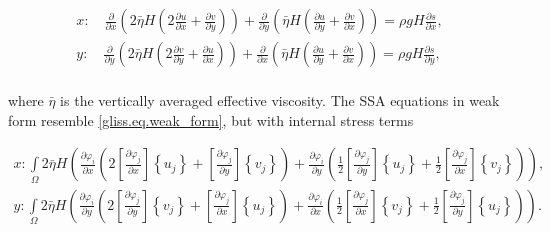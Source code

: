 {\begin{equation}
  \label{gliss.eq.stress_balance_ssa}
  \begin{split}
    x: \quad \frac{\partial }{\partial x}\left( 2 \bar{\eta} H \left(2\frac{\partial u}{\partial x} +  \frac{\partial v}{\partial y} \right) \right) 
    + \frac{\partial }{\partial y}\left( \bar{\eta} H \left( \frac{\partial u}{\partial y} + \frac{\partial v}{\partial x} \right) \right) 
    = \rho gH \frac{\partial s}{\partial x}, \\
    y: \quad \frac{\partial }{\partial y}\left( 2 \bar{\eta} H \left( 2\frac{\partial v}{\partial y} + \frac{\partial u}{\partial x} \right) \right) 
    + \frac{\partial }{\partial x}\left( \bar{\eta} H \left( \frac{\partial u}{\partial y} + \frac{\partial v}{\partial x} \right) \right) 
    = \rho gH \frac{\partial s}{\partial y},  \\
  \end{split}
\end{equation}

\noindent
where $\bar{\eta}$ is the vertically averaged effective viscosity.
The SSA equations in weak form resemble \eqref{gliss.eq.weak_form},
but with internal stress terms

\begin{equation}
  \label{gliss.eq.element_matrix_ssa}
  \begin{split}
    x: \int\limits_{\Omega }{2\bar{\eta} H \left( \frac{\partial {{\varphi }_{i}}}{\partial x}\left( 2\left[ \frac{\partial {{\varphi }_{j}}}{\partial x} \right]\left\{ {{u}_{j}} \right\} + \left[ \frac{\partial {{\varphi }_{j}}}{\partial y} \right]\left\{ {{v}_{j}} \right\} \right) +
      \frac{\partial {{\varphi }_{i}}}{\partial y}\left( \frac{1}{2}\left[ \frac{\partial {{\varphi }_{j}}}{\partial y} \right]\left\{ {{u}_{j}} \right\}+\frac{1}{2}\left[ \frac{\partial {{\varphi }_{j}}}{\partial x} \right]\left\{ {{v}_{j}} \right\} \right) \right)},  \\
    y: \int\limits_{\Omega }{2\bar{\eta} H \left( \frac{\partial {{\varphi }_{i}}}{\partial y}\left( 2\left[ \frac{\partial {{\varphi }_{j}}}{\partial y} \right]\left\{ {{v}_{j}} \right\} + \left[ \frac{\partial {{\varphi }_{j}}}{\partial x} \right]\left\{ {{u}_{j}} \right\} \right) + 
      \frac{\partial {{\varphi }_{i}}}{\partial x}\left( \frac{1}{2}\left[ \frac{\partial {{\varphi }_{j}}}{\partial x} \right]\left\{ {{v}_{j}} \right\}+\frac{1}{2}\left[ \frac{\partial {{\varphi }_{j}}}{\partial y} \right]\left\{ {{u}_{j}} \right\} \right) \right)}.  \\
  \end{split}
\end{equation}

}
